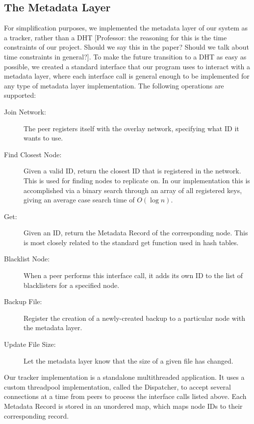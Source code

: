 \documentclass[12pt]{report}
\begin{document}
\subsection{The Metadata Layer} \label{subsec:TheMetadataLayer_sec:SystemDesign}
For simplification purposes, we implemented the metadata layer of our system as a tracker, rather than a DHT [Professor: the reasoning for this is the time constraints of our project. Should we say this in the paper? Should we talk about time constraints in general?]. To make the future transition to a DHT as easy as possible, we created a standard interface that our program uses to interact with a metadata layer, where each interface call is general enough to be implemented for any type of metadata layer implementation. The following operations are supported:
\begin{description}
\item[Join Network:] The peer registers itself with the overlay network, specifying what ID it wants to use.
\item[Find Closest Node:] Given a valid ID, return the closest ID that is registered in the network. This is used for finding nodes to replicate on. In our implementation this is accomplished via a binary search through an array of all registered keys, giving an average case search time of $O(\log n)$.
\item[Get:] Given an ID, return the Metadata Record of the corresponding node. This is most closely related to the standard get function used in hash tables.
\item[Blacklist Node:] When a peer performs this interface call, it adds its own ID to the list of blacklisters for a specified node.
\item[Backup File:] Register the creation of a newly-created backup to a particular node with the metadata layer.
\item[Update File Size:] Let the metadata layer know that the size of a given file has changed.
\end{description}
Our tracker implementation is a standalone multithreaded application. It uses a custom threadpool implementation, called the Dispatcher, to accept several connections at a time from peers to process the interface calls listed above. Each Metadata Record is stored in an unordered map, which maps node IDs to their corresponding record.
\end{document}
